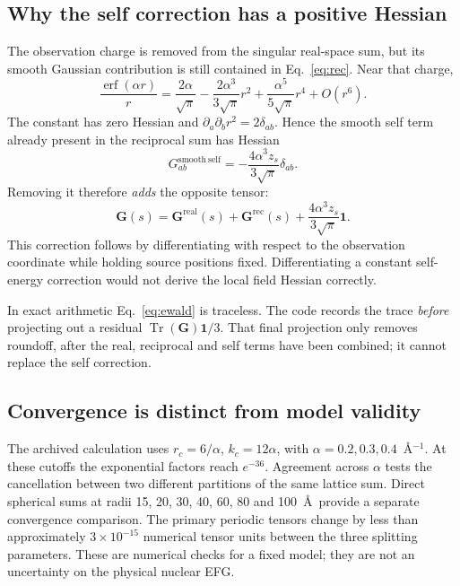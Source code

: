 \documentclass[11pt,a4paper]{article}
\newcommand{\erf}{\operatorname{erf}}
\newcommand{\Tr}{\operatorname{Tr}}
\newcommand{\Id}{\mathbf 1}
\newcommand{\G}{\bm G}
\begin{document}
\subsection{Why the self correction has a positive Hessian}

The observation charge is removed from the singular real-space sum, but its
smooth Gaussian contribution is still contained in Eq.~\eqref{eq:rec}. Near
that charge,
\begin{equation}
 \frac{\erf(\alpha r)}r
 =\frac{2\alpha}{\sqrt\pi}
 -\frac{2\alpha^3}{3\sqrt\pi}r^2
 +\frac{\alpha^5}{5\sqrt\pi}r^4+O(r^6).
\end{equation}
The constant has zero Hessian and
$\partial_a\partial_b r^2=2\delta_{ab}$. Hence the smooth self term already
present in the reciprocal sum has Hessian
\begin{equation}
 G^{\mathrm{smooth\ self}}_{ab}
 =-\frac{4\alpha^3z_s}{3\sqrt\pi}\delta_{ab}.
\end{equation}
Removing it therefore \emph{adds} the opposite tensor:
\begin{equation}
 \boxed{\quad
 \G(s)=\G^{\mathrm{real}}(s)+\G^{\mathrm{rec}}(s)
 +\frac{4\alpha^3z_s}{3\sqrt\pi}\Id .\quad}
\label{eq:ewald}
\end{equation}
This correction follows by differentiating with respect to the observation
coordinate while holding source positions fixed. Differentiating a constant
self-energy correction would not derive the local field Hessian correctly.

In exact arithmetic Eq.~\eqref{eq:ewald} is traceless. The code records the trace
\emph{before} projecting out a residual $\Tr(\G)\Id/3$. That final projection
only removes roundoff, after the real, reciprocal and self terms have been
combined; it cannot replace the self correction.

\subsection{Convergence is distinct from model validity}

The archived calculation uses $r_c=6/\alpha$, $k_c=12\alpha$, with
$\alpha=0.2,0.3,0.4$~\AA$^{-1}$. At these cutoffs the exponential factors reach
$e^{-36}$. Agreement across $\alpha$ tests the cancellation between two different
partitions of the same lattice sum. Direct spherical sums at radii
15, 20, 30, 40, 60, 80 and 100~\AA\ provide a separate convergence comparison.
The primary periodic tensors change by less than approximately
$3\times10^{-15}$ numerical tensor units between the three splitting parameters.
These are numerical checks for a fixed model; they are not an uncertainty on
the physical nuclear EFG.
\end{document}
